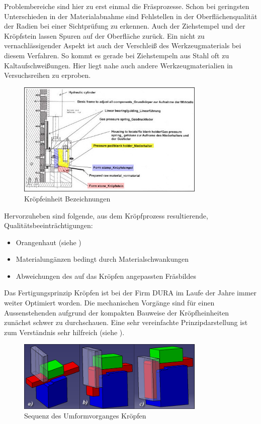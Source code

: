 \documentclass[12pt,a4paper,parskip]{scrartcl}
\begin{document}
 
Problembereiche sind hier zu erst einmal die Fräsprozesse. Schon bei geringsten Unterschieden in der Materialabnahme sind Fehlstellen in der Oberflächenqualität der Radien bei einer Sichtprüfung zu erkennen. Auch der Ziehstempel und der Kröpfstein lassen Spuren auf der Oberfläche zurück. Ein nicht zu vernachlässigender Aspekt ist auch der Verschleiß des Werkzeugmaterials bei diesem Verfahren. So kommt es gerade bei Ziehstempeln aus Stahl oft zu Kaltaufschweißungen. Hier liegt nahe auch andere Werkzeugmaterialien in Versuchsreihen zu erproben.
\begin{figure}[hbtp]
\centering
\includegraphics[width=0.8\textwidth]{kropfeinzeichFarb}
\caption{Kröpfeinheit Bezeichnungen}
\label{krofpfarbbezeich}
\end{figure}





\medskip

Hervorzuheben sind folgende, aus dem Kröpfprozess resultierende, Qualitätsbeeinträchtigungen:
\begin{itemize}
\item Orangenhaut (siehe )
\item Materialungänzen bedingt durch Materialschwankungen
\item Abweichungen des auf das Kröpfen angepassten Fräsbildes
\end{itemize}

Das Fertigungsprinzip Kröpfen  ist bei der Firm DURA im  Laufe der Jahre immer weiter Optimiert worden. Die mechanischen Vorgänge sind für einen Aussenstehenden aufgrund der kompakten Bauweise der Kröpfheinheiten zunächst schwer zu durchschauen. Eine sehr vereinfachte Prinzipdarstellung ist zum Verständnis sehr hilfreich (siehe ).\\
\begin{figure}[hbtp]
\centering
\includegraphics[width=0.8\textwidth]{krpfsequenz}
\caption{Sequenz des Umformvorganges Kröpfen}
\label{fig:krpfprinz}
\end{figure}
\end{document}
